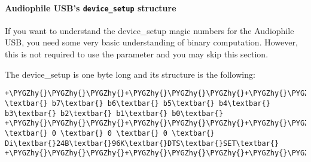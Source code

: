 \documentclass[a4paper,8pt,english]{sphinxmanual}
\def\PYGZhy{\char`\-}
\begin{document}
\paragraph{Audiophile USB's \texttt{device\_setup} structure}
\label{sound/cards/audiophile-usb:audiophile-usb-s-device-setup-structure}
If you want to understand the device\_setup magic numbers for the Audiophile
USB, you need some very basic understanding of binary computation. However,
this is not required to use the parameter and you may skip this section.

The device\_setup is one byte long and its structure is the following:

\begin{Verbatim}[commandchars=\\\{\}]
+\PYGZhy{}\PYGZhy{}\PYGZhy{}+\PYGZhy{}\PYGZhy{}\PYGZhy{}+\PYGZhy{}\PYGZhy{}\PYGZhy{}+\PYGZhy{}\PYGZhy{}\PYGZhy{}+\PYGZhy{}\PYGZhy{}\PYGZhy{}+\PYGZhy{}\PYGZhy{}\PYGZhy{}+\PYGZhy{}\PYGZhy{}\PYGZhy{}+\PYGZhy{}\PYGZhy{}\PYGZhy{}+
\textbar{} b7\textbar{} b6\textbar{} b5\textbar{} b4\textbar{} b3\textbar{} b2\textbar{} b1\textbar{} b0\textbar{}
+\PYGZhy{}\PYGZhy{}\PYGZhy{}+\PYGZhy{}\PYGZhy{}\PYGZhy{}+\PYGZhy{}\PYGZhy{}\PYGZhy{}+\PYGZhy{}\PYGZhy{}\PYGZhy{}+\PYGZhy{}\PYGZhy{}\PYGZhy{}+\PYGZhy{}\PYGZhy{}\PYGZhy{}+\PYGZhy{}\PYGZhy{}\PYGZhy{}+\PYGZhy{}\PYGZhy{}\PYGZhy{}+
\textbar{} 0 \textbar{} 0 \textbar{} 0 \textbar{} Di\textbar{}24B\textbar{}96K\textbar{}DTS\textbar{}SET\textbar{}
+\PYGZhy{}\PYGZhy{}\PYGZhy{}+\PYGZhy{}\PYGZhy{}\PYGZhy{}+\PYGZhy{}\PYGZhy{}\PYGZhy{}+\PYGZhy{}\PYGZhy{}\PYGZhy{}+\PYGZhy{}\PYGZhy{}\PYGZhy{}+\PYGZhy{}\PYGZhy{}\PYGZhy{}+\PYGZhy{}\PYGZhy{}\PYGZhy{}+\PYGZhy{}\PYGZhy{}\PYGZhy{}+
\end{Verbatim}
\end{document}
